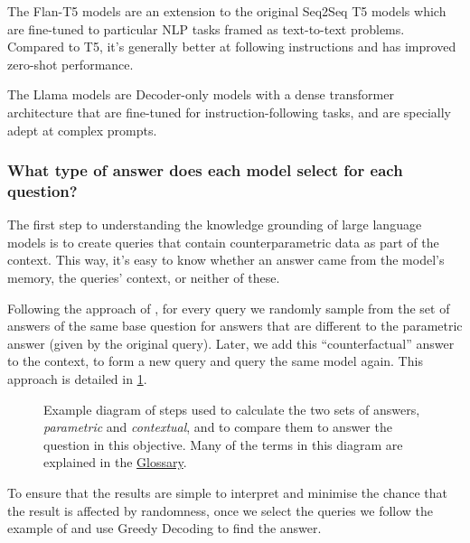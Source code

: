 The Flan-T5 models \citep{flant5} are an extension to the original Seq2Seq T5 models \citep{t5} which are fine-tuned to particular NLP tasks framed as text-to-text problems.
Compared to T5, it's generally better at following instructions and has improved zero-shot performance.

The Llama models \citep{llama3} are Decoder-only models with a dense transformer architecture that are fine-tuned for instruction-following tasks, and are specially adept at complex prompts.

\subsubsection{What type of answer does each model select for each question?}

The first step to understanding the knowledge grounding of large language models is to create queries that contain counterparametric data as part of the context.
This way, it's easy to know whether an answer came from the model's memory, the queries' context, or neither of these.

Following the approach of \citeauthor{factual_recall}, for every query we randomly sample from the set of answers of the same base question for answers that are different to the parametric answer (given by the original query).
Later, we add this ``counterfactual'' answer to the context, to form a new query and query the same model again.
This approach is detailed in \cref{action_diagram}.

\begin{figure}[ht]
	\centering
	\caption{Example diagram of steps used to calculate the two sets of answers, \textit{parametric} and \textit{contextual}, and to compare them to answer the question in this objective. Many of the terms in this diagram are explained in the \protect\hyperref[glossary]{Glossary}.}
	\label{action_diagram}
\end{figure}

To ensure that the results are simple to interpret and minimise the chance that the result is affected by randomness, once we select the queries we follow the example of \citeauthor{ragged} and use Greedy Decoding to find the answer.


